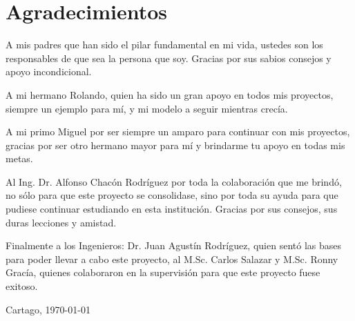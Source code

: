 \chapter*{Agradecimientos}
\thispagestyle{empty}

A mis padres que han sido el pilar fundamental en mi vida, ustedes son los responsables de que sea la persona que soy. Gracias por sus sabios consejos y apoyo incondicional.

A mi hermano Rolando, quien ha sido un gran apoyo en todos mis proyectos, siempre un ejemplo para mí, y mi modelo a seguir mientras crecía.

A mi primo Miguel por ser siempre un amparo para continuar con mis proyectos, gracias por ser otro hermano mayor para mí y brindarme tu apoyo en todas mis metas.

Al Ing. Dr. Alfonso Chacón Rodríguez por toda la colaboración que me brindó, no sólo para que este proyecto se consolidase, sino por toda su ayuda para que pudiese continuar estudiando en esta institución. Gracias por sus consejos, sus duras lecciones y amistad.

Finalmente a los Ingenieros: Dr.  Juan Agustín Rodríguez, quien sentó las bases para poder llevar a cabo este proyecto, al M.Sc. Carlos Salazar y M.Sc. Ronny Gracía, quienes colaboraron en la supervisión para que este proyecto fuese exitoso.







\vspace*{1cm}

\scriptAuthor

Cartago, \today

\cleardoublepage

